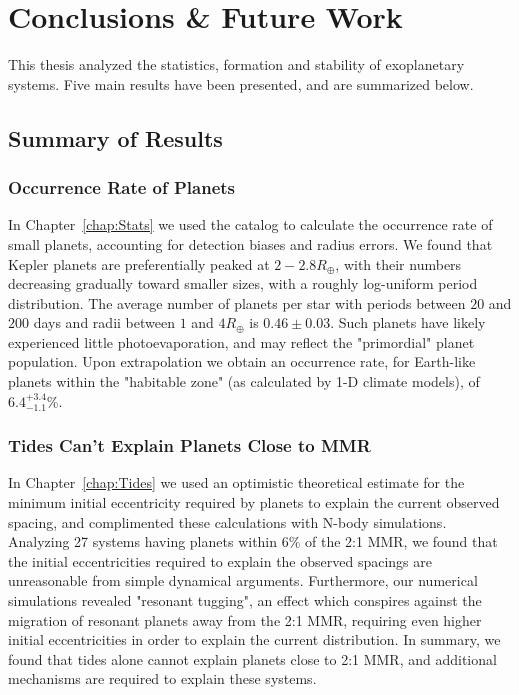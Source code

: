 \chapter{Conclusions \& Future Work}
\label{chap:conc}
This thesis analyzed the statistics, formation and stability of exoplanetary systems. 
Five main results have been presented, and are summarized below. 

\section{Summary of Results}
\subsection{Occurrence Rate of \kep Planets}
In Chapter~\ref{chap:Stats} we used the \citet{Ramirez2014} \kep catalog to calculate the occurrence rate of small planets, accounting for detection biases and radius errors. 
We found that Kepler planets are preferentially peaked at $2-2.8R_\oplus$, with their numbers decreasing gradually toward smaller sizes, with a roughly log-uniform period distribution.
The average number of planets per star with periods between $20$ and $200$ days and radii between $1$ and $4R_\oplus$ is $0.46 \pm 0.03$. 
Such planets have likely experienced little photoevaporation, and may reflect the "primordial" planet population. 
Upon extrapolation we obtain an occurrence rate, for Earth-like planets within the "habitable zone" (as calculated by 1-D climate models), of $6.4^{+3.4}_{-1.1}\%$. 

\subsection{Tides Can't Explain Planets Close to MMR}
In Chapter~\ref{chap:Tides} we used an optimistic theoretical estimate for the minimum initial eccentricity required by \kep planets to explain the current observed spacing, and complimented these calculations with N-body simulations.
Analyzing 27 \kep systems having planets within $6\%$ of the 2:1 MMR, we found that the initial eccentricities required to explain the observed spacings are unreasonable from simple dynamical arguments.
Furthermore, our numerical simulations revealed "resonant tugging", an effect which conspires against the migration of resonant planets away from the 2:1 MMR, requiring even higher initial eccentricities in order to explain the current \kep distribution. 
In summary, we found that tides alone cannot explain planets close to 2:1 MMR, and additional mechanisms are required to explain these systems. 

